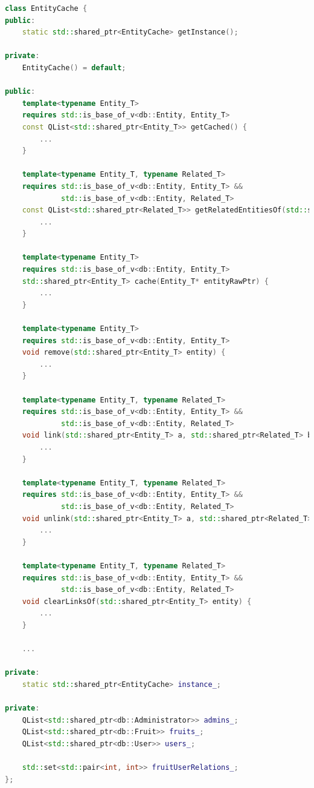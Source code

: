 \begin{lstlisting}[language={C++}]
class EntityCache {
public:
    static std::shared_ptr<EntityCache> getInstance();

private:
    EntityCache() = default;

public:
    template<typename Entity_T>
    requires std::is_base_of_v<db::Entity, Entity_T>
    const QList<std::shared_ptr<Entity_T>> getCached() {
        ...
    }

    template<typename Entity_T, typename Related_T>
    requires std::is_base_of_v<db::Entity, Entity_T> &&
             std::is_base_of_v<db::Entity, Related_T>
    const QList<std::shared_ptr<Related_T>> getRelatedEntitiesOf(std::shared_ptr<const Entity_T> entity) {
        ...
    }

    template<typename Entity_T>
    requires std::is_base_of_v<db::Entity, Entity_T>
    std::shared_ptr<Entity_T> cache(Entity_T* entityRawPtr) {
        ...
    }

    template<typename Entity_T>
    requires std::is_base_of_v<db::Entity, Entity_T>
    void remove(std::shared_ptr<Entity_T> entity) {
        ...
    }

    template<typename Entity_T, typename Related_T>
    requires std::is_base_of_v<db::Entity, Entity_T> &&
             std::is_base_of_v<db::Entity, Related_T>
    void link(std::shared_ptr<Entity_T> a, std::shared_ptr<Related_T> b) {
        ...
    }

    template<typename Entity_T, typename Related_T>
    requires std::is_base_of_v<db::Entity, Entity_T> &&
             std::is_base_of_v<db::Entity, Related_T>
    void unlink(std::shared_ptr<Entity_T> a, std::shared_ptr<Related_T> b) {
        ...
    }

    template<typename Entity_T, typename Related_T>
    requires std::is_base_of_v<db::Entity, Entity_T> &&
             std::is_base_of_v<db::Entity, Related_T>
    void clearLinksOf(std::shared_ptr<Entity_T> entity) {
        ...
    }

    ...

private:
    static std::shared_ptr<EntityCache> instance_;

private:
    QList<std::shared_ptr<db::Administrator>> admins_;
    QList<std::shared_ptr<db::Fruit>> fruits_;
    QList<std::shared_ptr<db::User>> users_;

    std::set<std::pair<int, int>> fruitUserRelations_;
};
\end{lstlisting}

